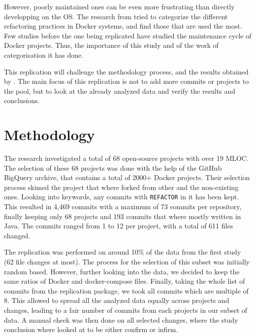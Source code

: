 \documentclass[lettersize,journal]{IEEEtran}
\begin{document}
However, poorly maintained ones can be even more frustrating than directly developping on the OS.
The research from \cite{1} tried to categorize the different refactoring practices in Docker systems, and find those that are used the most.
Few studies before the one being replicated have studied the maintenance cycle of Docker projects.
Thus, the importance of this study and of the work of categorisation it has done.

This replication will challenge the methodology process, and the results obtained by \cite{1}.
The main focus of this replication is not to add more commits or projects to the pool, but to look at the already analyzed data and verify the results and conclusions.

\section{Methodology}

The research investigated a total of 68 open-source projects with over 19 MLOC.
The selection of these 68 projects was done with the help of the GitHub BigQuery archive, that contains a total of 2000+ Docker projects.
Their selection process skimed the project that where forked from other and the non-existing ones.
Looking into keywords, any commits with \texttt{REFACTOR} in it has been kept.
This resulted in 4,469 commits with a maximum of 73 commits per repository, finally keeping only 68 projects and 193 commits that where mostly written in Java.
The commits ranged from 1 to 12 per project, with a total of 611 files changed.

The replication was performed on around 10\% of the data from the first study (62 file changes at most).
The process for the selection of this subset was initially random based.
However, further looking into the data, we decided to keep the same ratios of Docker and docker-compose files.
Finally, taking the whole list of commits from the replication package, we took all commits which are multiple of 8.
This allowed to spread all the analyzed data equally across projects and changes, leading to a fair number of commits from each projects in our subset of data.
A manual check was then done on all selected changes, where the study conclusion where looked at to be either confirm or infirm.
\end{document}

